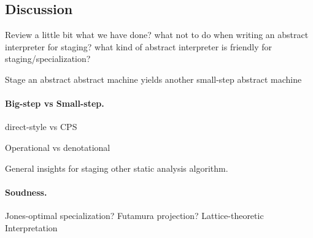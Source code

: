 \subsection{Discussion}
Review a little bit what we have done?
what not to do when writing an abstract interpreter for staging?
what kind of abstract interpreter is friendly for staging/specialization?

Stage an abstract abstract machine yields another small-step abstract machine

\paragraph{Big-step vs Small-step.}

direct-style vs CPS

Operational vs denotational

General insights for staging other static analysis algorithm.

\paragraph{Soudness.}

\cite{10.1007/3-540-61580-6_11}

Jones-optimal specialization?
Futamura projection?
Lattice-theoretic Interpretation
